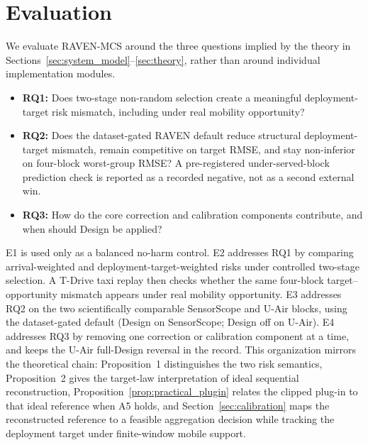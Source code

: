 \documentclass[letterpaper,journal]{IEEEtran}
\begin{document}
\section{Evaluation}
\label{sec:evaluation}

We evaluate RAVEN-MCS around the three questions implied by the theory in
Sections~\ref{sec:system_model}--\ref{sec:theory}, rather than around individual
implementation modules.

\begin{itemize}
    \item \textbf{RQ1:} Does two-stage non-random selection create a meaningful
    deployment-target risk mismatch, including under real mobility
    opportunity?
    \item \textbf{RQ2:} Does the dataset-gated RAVEN default reduce
    structural deployment-target mismatch, remain competitive on
    target RMSE, and stay non-inferior on four-block worst-group RMSE?
    A pre-registered under-served-block prediction check is reported
    as a recorded negative, not as a second external win.
    \item \textbf{RQ3:} How do the core correction and calibration components
    contribute, and when should Design be applied?
\end{itemize}

E1 is used only as a balanced no-harm control.  E2 addresses RQ1 by comparing
arrival-weighted and deployment-target-weighted risks under controlled
two-stage selection.  A T-Drive taxi replay then checks whether the same
four-block target--opportunity mismatch appears under real mobility
opportunity.  E3 addresses RQ2 on the two scientifically comparable
SensorScope and U-Air blocks, using the dataset-gated default
(Design on SensorScope; Design off on U-Air).  E4 addresses RQ3 by
removing one correction or calibration component at a time, and keeps
the U-Air full-Design reversal in the record.  This organization mirrors the
theoretical chain: Proposition~1 distinguishes the two risk semantics,
Proposition~2 gives the target-law interpretation of ideal sequential
reconstruction, Proposition~\ref{prop:practical_plugin} relates the
clipped plug-in to that ideal reference when A5 holds, and
Section~\ref{sec:calibration} maps the reconstructed reference to a feasible
aggregation decision while tracking the deployment target under finite-window
mobile support.
\end{document}
